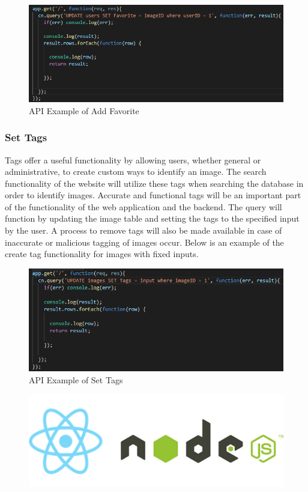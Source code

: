 \documentclass[12pt]{report}
\begin{document}
\begin{figure}[h]
	\centering
	\includegraphics[scale=0.5]{api_add_favorite}
	\caption{API Example of Add Favorite}
	\label{fig:API Add Favorite}
\end{figure}

\subsubsection*{Set Tags}

Tags offer a useful functionality by allowing users, whether general or administrative, to create custom ways to identify an image.  The search functionality of the website will utilize these tags when searching the database in order to identify images.  Accurate and functional tags will be an important part of the functionality of the web application and the backend.  The query will function by updating the image table and setting the tags to the specified input by the user.  A process to remove tags will also be made available in case of inaccurate or malicious tagging of images occur.  Below is an example of the create tag functionality for images with fixed inputs.

\begin{figure}[h]
	\centering
	\includegraphics[scale=0.5]{api_create_tags}
	\caption{API Example of Set Tags}
	\label{fig:API Set Tags}
\end{figure}

\begin{figure}[h]
	\centering
	\includegraphics[width=0.251\linewidth]{react_node}
\end{figure}
\end{document}
